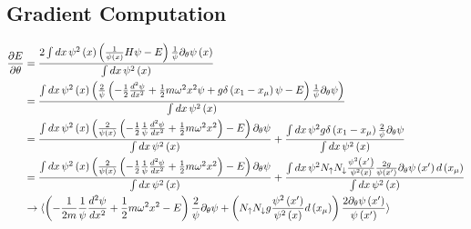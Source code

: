 \documentclass{notes}
\begin{document}
\subsection*{Gradient Computation}

\begin{align*}
	\frac{\partial E}{\partial \theta} &= \frac{2 \int dx\, \psi^2 \left(x\right) \left(\frac{1}{\psi\left(x\right)}H\psi - E \right)\frac{1}{\psi} \partial_\theta
	\psi\left(x\right)}{\int dx\, \psi^2 \left(x\right)} \\ 
									   &= \frac{\int dx\, \psi^2 \left(x\right)
										   \left(\frac{2}{\psi}\left(-\frac{1}{2}\frac{d ^2\psi}{d x^2} + \frac{1}{2}m\omega^2 x^2 \psi + g \delta \left(x_1-x_\mu\right)\psi -
									   E\right)\frac{1}{\psi}\partial_\theta\psi\right)}{\int dx\, \psi^2 \left(x\right)} \\ 
									   &= \frac{\int dx\, \psi^2 \left(x\right) \left(\frac{2}{\psi\left(x\right)}\left(-\frac{1}{2}\frac{1}{\psi}\frac{d
									   ^2\psi}{dx^2} + \frac{1}{2}m\omega^2 x^2\right) - E\right)\partial_\theta \psi}{\int dx\, \psi^2\left(x\right)} +
									   \frac{\int dx\, \psi^2 g \delta\left(x_1-x_\mu\right) \frac{2}{\psi} \partial_\theta \psi}{\int dx\, \psi^2 \left(x\right)} \\ 
									   &= \frac{\int dx\, \psi^2 \left(x\right) \left(\frac{2}{\psi\left(x\right)}\left(-\frac{1}{2}\frac{1}{\psi}\frac{d
									   ^2\psi}{dx^2} + \frac{1}{2}m\omega^2 x^2\right) - E\right)\partial_\theta \psi}{\int dx\, \psi^2\left(x\right)} +
									   \frac{\int dx\, \psi^2 N_{\uparrow}N_\downarrow\frac{\psi^2 \left(x'\right)}{\psi^2 \left(x\right)}\frac{2g}{\psi
									   \left(x'\right)}\partial_\theta \psi\left(x'\right)d \left(x_\mu\right)}{\int dx\, \psi^2\left(x\right)} \\ 
									   &\to \braket{\left(-\frac{1}{2m}\frac{1}{\psi} \frac{d ^2\psi}{d x^2} + \frac{1}{2}m\omega^2x^2 -
									   E\right)\frac{2}{\psi}\partial_\theta \psi + \left(N_\uparrow N_\downarrow g \frac{\psi^2
	  \left(x'\right)}{\psi^2 \left(x\right)}d \left(x_\mu\right)\right)\frac{2\partial_\theta
\psi\left(x'\right)}{\psi\left(x'\right)}}
\end{align*}
\end{document}
